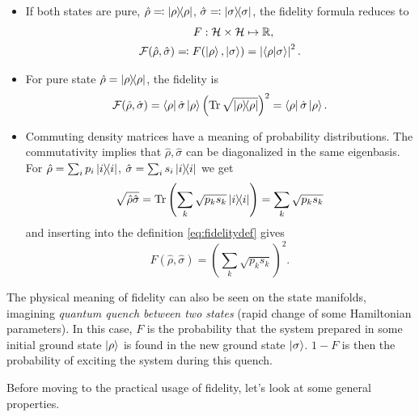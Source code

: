 \begin{itemize}
    \item If both states are pure, $\hat\rho\eqqcolon\ket{\rho}\!\!\bra{\rho}$, $\hat\sigma\eqqcolon\ket{\sigma}\!\!\bra{\sigma}$, the fidelity formula reduces to
    \begin{equation}
        \begin{split}    
            F: \mathcal{H}\times\mathcal{H}&\mapsto \mathbb{R}, \\
            \mathcal F(\hat\rho,\hat\sigma)  \eqqcolon F(\ket{\rho},\ket{\sigma}) &= \left| \braket{\rho|\sigma}\right|^2.
        \end{split}
    \end{equation}

    \item For pure state $\hat\rho=\ket{\rho}\!\!\bra{\rho}$, the fidelity is
    \begin{equation}
        \mathcal F(\hat\rho,\hat\sigma) = \bra{\rho}\hat\sigma \ket{\rho} \left(\operatorname{\textrm{Tr}}\sqrt{\ket{\rho}\!\!\bra{\rho}} \right)^2 = \bra{\rho}\hat\sigma \ket{\rho}.
    \end{equation}
    
    \item Commuting density matrices have a meaning of probability distributions. The commutativity implies that $\hat\rho,\hat\sigma$ can be diagonalized in the same eigenbasis. For $\hat\rho = \sum_i p_i \ket{i}\!\!\bra{i}$, $\hat\sigma = \sum_i s_i \ket{i}\!\!\bra{i}$ we get
    \begin{equation}
        \sqrt{\hat\rho \hat\sigma}=\operatorname{\textrm{Tr}}\left(\sum_k\sqrt{p_k s_k}\ket{i}\!\!\bra{i}\right)=\sum_k\sqrt{p_k s_k}
    \end{equation}
    and inserting into the definition \ref{eq:fidelitydef} gives
    \begin{equation}
        F(\hat\rho,\hat\sigma)=\left(\sum_k\sqrt{p_k s_k}\right)^2.
    \end{equation} 

\end{itemize}
    
    
The physical meaning of fidelity can also be seen on the state manifolds, imagining \emph{quantum quench between two states} (rapid change of some Hamiltonian parameters). In this case, $F$ is the probability that the system prepared in some initial ground state $\ket{\rho}$ is found in the new ground state $\ket{\sigma}$. $1-F$ is then the probability of exciting the system during this quench.

Before moving to the practical usage of fidelity, let's look at some general properties.
    

